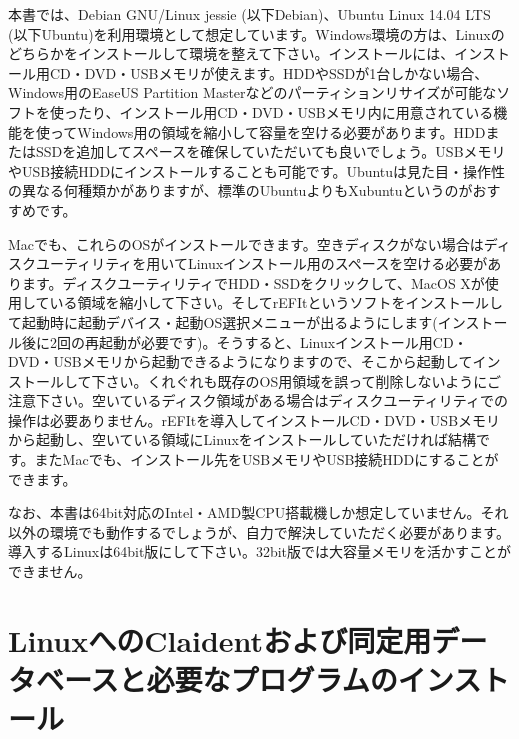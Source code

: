 \documentclass[titlepage,10pt,a4paper]{jsbook}
\begin{document}
本書では、Debian GNU/Linux jessie (以下Debian)、Ubuntu Linux 14.04 LTS (以下Ubuntu)を利用環境として想定しています。Windows環境の方は、Linuxのどちらかをインストールして環境を整えて下さい。インストールには、インストール用CD・DVD・USBメモリが使えます。HDDやSSDが1台しかない場合、Windows用のEaseUS Partition Masterなどのパーティションリサイズが可能なソフトを使ったり、インストール用CD・DVD・USBメモリ内に用意されている機能を使ってWindows用の領域を縮小して容量を空ける必要があります。HDDまたはSSDを追加してスペースを確保していただいても良いでしょう。USBメモリやUSB接続HDDにインストールすることも可能です。Ubuntuは見た目・操作性の異なる何種類かがありますが、標準のUbuntuよりもXubuntuというのがおすすめです。

Macでも、これらのOSがインストールできます。空きディスクがない場合はディスクユーティリティを用いてLinuxインストール用のスペースを空ける必要があります。ディスクユーティリティでHDD・SSDをクリックして、MacOS Xが使用している領域を縮小して下さい。そしてrEFItというソフトをインストールして起動時に起動デバイス・起動OS選択メニューが出るようにします(インストール後に2回の再起動が必要です)。そうすると、Linuxインストール用CD・DVD・USBメモリから起動できるようになりますので、そこから起動してインストールして下さい。くれぐれも既存のOS用領域を誤って削除しないようにご注意下さい。空いているディスク領域がある場合はディスクユーティリティでの操作は必要ありません。rEFItを導入してインストールCD・DVD・USBメモリから起動し、空いている領域にLinuxをインストールしていただければ結構です。またMacでも、インストール先をUSBメモリやUSB接続HDDにすることができます。

なお、本書は64bit対応のIntel・AMD製CPU搭載機しか想定していません。それ以外の環境でも動作するでしょうが、自力で解決していただく必要があります。導入するLinuxは64bit版にして下さい。32bit版では大容量メモリを活かすことができません。

\section{LinuxへのClaidentおよび同定用データベースと必要なプログラムのインストール}
\end{document}
